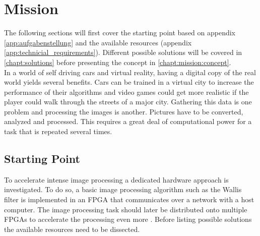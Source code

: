 %
%
\chapter{Mission} \label{chapt:mission}
The following sections will first cover the starting point based on appendix \ref{app:aufgabenstellung} and the available resources (appendix \ref{app:technicial_requirements}). Different possible solutions will be covered in \ref{chapt:solutions} before presenting the concept in \ref{chapt:mission:concept}. \\

In a world of self driving cars and virtual reality, having a digital copy of
the real world yields several benefits. Cars can be trained in a virtual city
to increase the performance of their algorithms and video games could get more
realistic if the player could walk through the streets of a major city. Gathering this data is one problem and processing the images is another. Pictures have to be converted, analyzed and processed. This requires a great deal of computational power for a task that is repeated several times.

%
%
\section{Starting Point}
To accelerate intense image processing a dedicated hardware approach is investigated. To do so, a basic image processing algorithm such as the Wallis filter is implemented in an FPGA that communicates over a network with a host computer. The image processing task should later be distributed onto multiple FPGAs to accelerate the processing even more \cite{nomokoReqs}. Before listing possible solutions the available resources need to be dissected.

